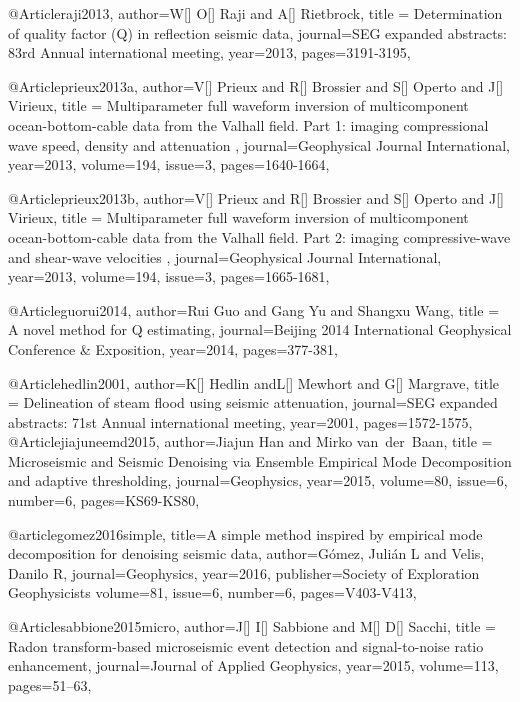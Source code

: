 {@Article{raji2013,
  author={W[] O[] Raji and A[] Rietbrock},
  title = {Determination of quality factor (Q) in reflection seismic data},
  journal={SEG expanded abstracts: 83rd Annual international meeting},
  year=2013,
  pages={3191-3195},
}

@Article{prieux2013a,
  author={V[] Prieux and R[] Brossier and S[] Operto and J[] Virieux},
  title = {Multiparameter full waveform inversion of multicomponent ocean-bottom-cable data from the Valhall field. {P}art 1: imaging compressional wave speed, density and attenuation },
  journal={Geophysical Journal International},
  year=2013,
  volume=194,
  issue=3,
  pages={1640-1664},
}

@Article{prieux2013b,
  author={V[] Prieux and R[] Brossier and S[] Operto and J[] Virieux},
  title = {Multiparameter full waveform inversion of multicomponent ocean-bottom-cable data from the Valhall field. {P}art 2: imaging compressive-wave and shear-wave velocities },
  journal={Geophysical Journal International},
  year=2013,
  volume=194,
  issue=3,
  pages={1665-1681},
}




@Article{guorui2014,
  author={Rui Guo and Gang Yu and Shangxu Wang},
  title = {A novel method for Q estimating},
  journal={Beijing 2014 International Geophysical Conference \& Exposition},
  year=2014,
  pages={377-381},
}

@Article{hedlin2001,
  author={K[] Hedlin andL[] Mewhort and G[] Margrave},
  title = {Delineation of steam flood using seismic attenuation},
  journal={SEG expanded abstracts: 71st Annual international meeting},
  year=2001,
  pages={1572-1575},
}
@Article{jiajuneemd2015,
  author={Jiajun Han and Mirko van~der~Baan},
  title = {Microseismic and Seismic Denoising via Ensemble Empirical Mode Decomposition and adaptive thresholding},
  journal={Geophysics},
  year=2015,
volume=80,
issue=6,
number=6,
  pages={KS69-KS80},
}

@article{gomez2016simple,
  title={A simple method inspired by empirical mode decomposition for denoising seismic data},
  author={G{\'o}mez, Juli{\'a}n L and Velis, Danilo R},
  journal={Geophysics},
  year={2016},
  publisher={Society of Exploration Geophysicists}
volume=81,
issue=6,
number=6,
  pages={V403-V413},
}

@Article{sabbione2015micro,
  author={J[] I[] Sabbione and M[] D[] Sacchi},
  title = {Radon transform-based microseismic event detection and signal-to-noise ratio enhancement},
  journal={Journal of Applied Geophysics},
  year=2015,
volume=113,
  pages={51–63},
}

}
